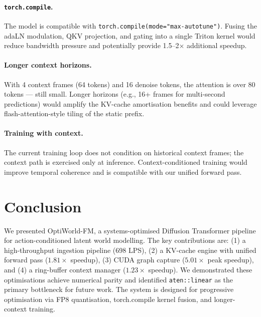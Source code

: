 \documentclass[letterpaper,twocolumn,10pt]{article}
\begin{document}
\paragraph{\texttt{torch.compile}.}
The model is compatible with \texttt{torch.compile(mode="max-autotune")}.
Fusing the adaLN modulation, QKV projection, and gating into a single
Triton kernel would reduce bandwidth pressure and potentially provide
1.5--2$\times$ additional speedup.

\paragraph{Longer context horizons.}
With 4 context frames (64 tokens) and 16 denoise tokens, the attention
is over 80 tokens — still small.  Longer horizons (e.g., 16+ frames for
multi-second predictions) would amplify the KV-cache amortisation
benefits and could leverage flash-attention-style tiling of the static
prefix.

\paragraph{Training with context.}
The current training loop does not condition on historical context frames;
the context path is exercised only at inference.  Context-conditioned
training would improve temporal coherence and is compatible with our
unified forward pass.

\section{Conclusion}

We presented OptiWorld-FM, a systems-optimised Diffusion Transformer
pipeline for action-conditioned latent world modelling. The key
contributions are: (1) a high-throughput ingestion pipeline (698 LPS),
(2) a KV-cache engine with unified forward pass ($1.81\times$ speedup),
(3) CUDA graph capture ($5.01\times$ peak speedup), and (4) a ring-buffer
context manager ($1.23\times$ speedup).  We demonstrated these
optimisations achieve numerical parity and identified \texttt{aten::linear}
as the primary bottleneck for future work.  The system is designed for
progressive optimisation via FP8 quantisation, torch.compile kernel
fusion, and longer-context training.
\end{document}
